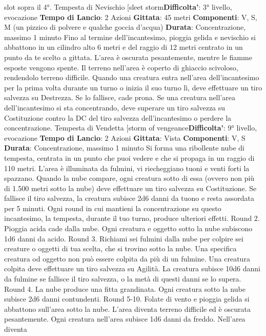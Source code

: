 \begin{multicols}{2}
slot sopra il 4°.
Tempesta di Nevischio
[sleet storm\textbf{Difficolta'}:
3° livello, evocazione
\textbf{Tempo di Lancio}: 2 Azioni
\textbf{Gittata}: 45 metri
\textbf{Componenti}: V, S, M (un pizzico di polvere e qualche
goccia d’acqua)
\textbf{Durata}: Concentrazione, massimo 1 minuto
Fino al termine dell’incantesimo, pioggia gelida e
nevischio si abbattono in un cilindro alto 6 metri e del
raggio di 12 metri centrato in un punto da te scelto a
gittata. L’area è oscurata pesantemente, mentre le
fiamme esposte vengono spente.
Il terreno nell’area è coperto di ghiaccio scivoloso,
rendendolo terreno difficile. Quando una creatura entra
nell’area dell’incantesimo per la prima volta durante un
turno o inizia il suo turno lì, deve effettuare un tiro
salvezza su Destrezza. Se lo fallisce, cade prona.
Se una creatura nell’area dell’incantesimo si sta
concentrando, deve superare un tiro salvezza su
Costituzione contro la DC del tiro salvezza
dell’incantesimo o perdere la concentrazione.
Tempesta di Vendetta
[storm of vengeance\textbf{Difficolta'}:
9° livello, evocazione
\textbf{Tempo di Lancio}: 2 Azioni
\textbf{Gittata}: Vista
\textbf{Componenti}: V, S
\textbf{Durata}: Concentrazione, massimo 1 minuto
Si forma una ribollente nube di tempesta, centrata in un
punto che puoi vedere e che si propaga in un raggio di
110 metri. L’area è illuminata da fulmini, vi riecheggiano
tuoni e venti forti la spazzano. Quando la nube
compare, ogni creatura sotto di essa (ovvero non più di
1.500 metri sotto la nube) deve effettuare un tiro
salvezza su Costituzione. Se fallisce il tiro salvezza, la
creatura subisce 2d6 danni da tuono e resta assordata
per 5 minuti.
Ogni round in cui mantieni la concentrazione su questo
incantesimo, la tempesta, durante il tuo turno, produce
ulteriori effetti.
Round 2. Pioggia acida cade dalla nube. Ogni creatura
e oggetto sotto la nube subiscono 1d6 danni da acido.
Round 3. Richiami sei fulmini dalla nube per colpire sei
creature o oggetti di tua scelta, che si trovino sotto la
nube. Una specifica creatura od oggetto non può
essere colpita da più di un fulmine. Una creatura colpita
deve effettuare un tiro salvezza su Agilità. La
creatura subisce 10d6 danni da fulmine se fallisce il tiro
salvezza, o la metà di questi danni se lo supera.
Round 4. La nube produce una fitta grandinata. Ogni
creatura sotto la nube subisce 2d6 danni contundenti.
Round 5-10. Folate di vento e pioggia gelida si
abbattono sull’area sotto la nube. L’area diventa terreno
difficile ed è oscurata pesantemente. Ogni creatura
nell’area subisce 1d6 danni da freddo. Nell’area diventa

\end{multicols}
